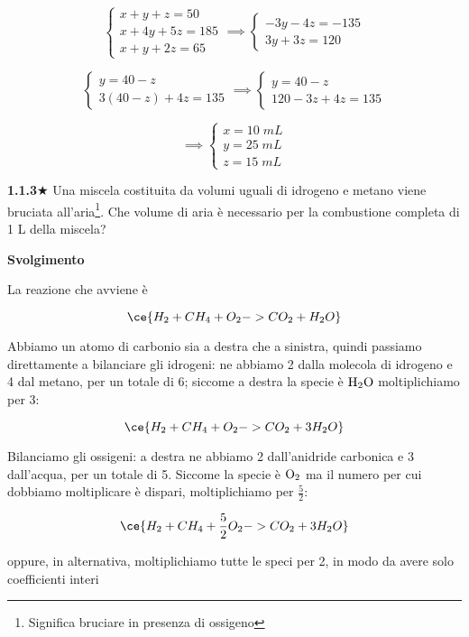 $$\begin{cases}
    x+y+z=50\\
    x + 4y + 5z=185\\
    x+y+2z=65
\end{cases}
\implies
\begin{cases}
    -3y-4z=-135\\
    3y+3z=120
\end{cases}$$

$$\begin{cases}
    y=40-z\\
    3(40-z) + 4z=135
\end{cases}
\implies
\begin{cases}
    y=40-z\\
    120 - 3z + 4z=135
\end{cases}$$

$$\implies
\begin{cases}
    x=10\;mL\\
    y=25\;mL\\
    z=15\;mL
\end{cases}$$

\vspace{0.2cm}\textbf{1.1.3}$\bigstar$ Una miscela costituita da volumi uguali di idrogeno e metano viene bruciata all'aria\footnote{Significa bruciare in presenza di ossigeno}. Che volume di aria è necessario per la combustione completa di 1 L della miscela?

\vspace{0.2cm}\large\textbf{Svolgimento}\normalsize

\vspace{0.2cm}La reazione che avviene è

$$\ce{H_2 + CH_4 + O_2 -> CO_2 + H_2O}$$

Abbiamo un atomo di carbonio sia a destra che a sinistra, quindi passiamo direttamente a bilanciare gli idrogeni: ne abbiamo 2 dalla molecola di idrogeno e 4 dal metano, per un totale di 6; siccome a destra la specie è $\rm H_2O$ moltiplichiamo per 3:

$$\ce{H_2 + CH_4 + O_2 -> CO_2 + 3H_2O}$$

Bilanciamo gli ossigeni: a destra ne abbiamo 2 dall'anidride carbonica e 3 dall'acqua, per un totale di 5. Siccome la specie è $\rm O_2$ ma il numero per cui dobbiamo moltiplicare è dispari, moltiplichiamo per $\frac{5}{2}$:

$$\ce{H_2 + CH_4 + \frac{5}{2}O_2 -> CO_2 + 3H_2O}$$

oppure, in alternativa, moltiplichiamo tutte le speci per 2, in modo da avere solo coefficienti interi


